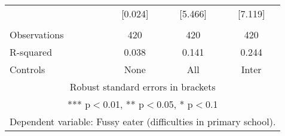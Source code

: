 \begin{tabular}{lccc}
 & [0.024] & [5.466] & [7.119] \\
 &  &  &  \\
Observations & 420 & 420 & 420 \\
R-squared & 0.038 & 0.141 & 0.244 \\
 Controls & None & All & Inter \\ \hline
\multicolumn{4}{c}{ Robust standard errors in brackets} \\
\multicolumn{4}{c}{ *** p$<$0.01, ** p$<$0.05, * p$<$0.1} \\
\multicolumn{4}{c}{ Dependent variable: Fussy eater (difficulties in primary school).} \\
\end{tabular}
